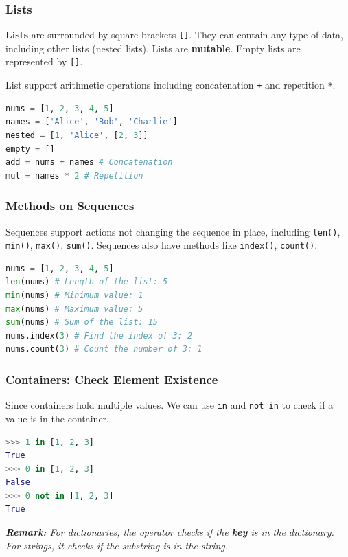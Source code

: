 \documentclass[beamer, en, version=2.0]{huangfusl-template}
\begin{document}
    \begin{frame}[fragile]
        \frametitle{Lists}

        \textbf{Lists} are surrounded by square brackets {\footnotesize\verb|[]|}. They can contain any type of data, including other lists (nested lists). Lists are \textbf{mutable}. Empty lists are represented by {\footnotesize\verb|[]|}.

        List support arithmetic operations including concatenation {\footnotesize\verb|+|} and repetition {\footnotesize\verb|*|}.

\begin{lstlisting}[language=python]
nums = [1, 2, 3, 4, 5]
names = ['Alice', 'Bob', 'Charlie']
nested = [1, 'Alice', [2, 3]]
empty = []
add = nums + names # Concatenation
mul = names * 2 # Repetition
\end{lstlisting}
    \end{frame}
    \begin{frame}[fragile]
        \frametitle{Methods on Sequences}

        Sequences support actions not changing the sequence in place, including {\footnotesize\verb|len()|}, {\footnotesize\verb|min()|}, {\footnotesize\verb|max()|}, {\footnotesize\verb|sum()|}. Sequences also have methods like {\footnotesize\verb|index()|}, {\footnotesize\verb|count()|}.

\begin{lstlisting}[language=python]
nums = [1, 2, 3, 4, 5]
len(nums) # Length of the list: 5
min(nums) # Minimum value: 1
max(nums) # Maximum value: 5
sum(nums) # Sum of the list: 15
nums.index(3) # Find the index of 3: 2
nums.count(3) # Count the number of 3: 1
\end{lstlisting}
    \end{frame}
    \begin{frame}[fragile]
        \frametitle{Containers: Check Element Existence}

        Since containers hold multiple values. We can use {\footnotesize\verb|in|} and {\footnotesize\verb|not in|} to check if a value is in the container.

\begin{lstlisting}[language=python]
>>> 1 in [1, 2, 3]
True
>>> 0 in [1, 2, 3]
False
>>> 0 not in [1, 2, 3]
True
\end{lstlisting}


        {\footnotesize\itshape\textbf{Remark:} For dictionaries, the operator checks if the \textbf{key} is in the dictionary. For strings, it checks if the substring is in the string.}

    \end{frame}
\end{document}
